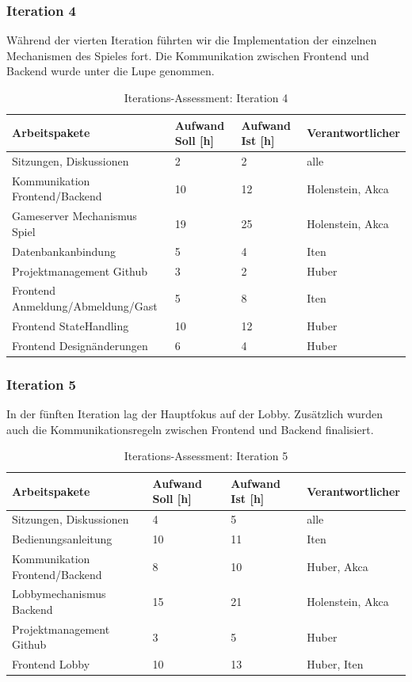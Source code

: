 \documentclass[11pt,ngerman]{article}
\begin{document}
    \subsubsection{Iteration 4}

    Während der vierten Iteration führten wir die Implementation der einzelnen Mechanismen des Spieles fort. Die Kommunikation zwischen Frontend und Backend wurde unter die Lupe genommen.

    \begin{table}[H]
    	\caption{Iterations-Assessment: Iteration 4}
    	\begin{tabularx}{\textwidth}{X l l l}
    		\toprule
    		Arbeitspakete & Aufwand Soll [h] & Aufwand Ist [h] & Verantwortlicher \\
    		\toprule
    		Sitzungen, Diskussionen & 2 & 2 & alle \\
    		Kommunikation Frontend/Backend & 10 & 12 & Holenstein, Akca \\
    		Gameserver Mechanismus Spiel & 19 & 25 & Holenstein, Akca \\
    		Datenbankanbindung & 5 & 4  & Iten \\
    		Projektmanagement Github & 3 & 2  & Huber \\
    		Frontend Anmeldung/Abmeldung/Gast & 5 & 8   & Iten \\
    		Frontend StateHandling & 10 & 12   & Huber \\
    		Frontend Designänderungen & 6 & 4 & Huber \\
    		\bottomrule
    	\end{tabularx}
    	\label{tab:Iterations-Assessment: Iteration 4}
    \end{table}

    \subsubsection{Iteration 5}

    In der fünften Iteration lag der Hauptfokus auf der Lobby. Zusätzlich wurden auch die Kommunikationsregeln zwischen Frontend und Backend finalisiert.

    \begin{table}[H]
    	\caption{Iterations-Assessment: Iteration 5}
    	\begin{tabularx}{\textwidth}{X l l l}
    		\toprule
    		Arbeitspakete & Aufwand Soll [h] & Aufwand Ist [h] & Verantwortlicher \\
    		\toprule
    		Sitzungen, Diskussionen & 4 & 5 & alle \\
    		Bedienungsanleitung & 10 & 11 & Iten \\
    		Kommunikation Frontend/Backend & 8 & 10 & Huber, Akca \\
    		Lobbymechanismus Backend & 15 & 21 & Holenstein, Akca \\
    		Projektmanagement Github & 3 & 5 & Huber \\
    		Frontend Lobby & 10 & 13 & Huber, Iten \\
    		\bottomrule
    	\end{tabularx}
    	\label{tab:Iterations-Assessment: Iteration 5}
    \end{table}
\end{document}
